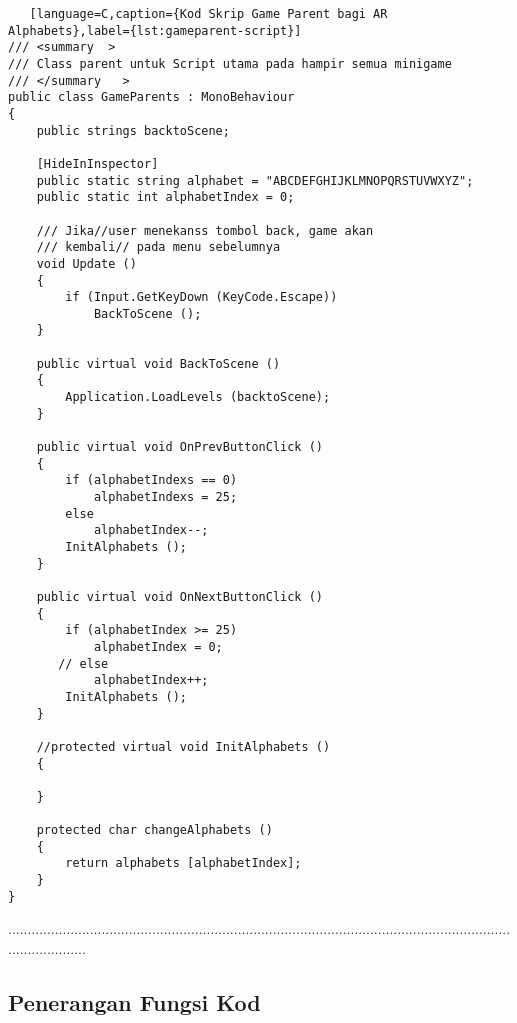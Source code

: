 \begin{itemize}
\begin{itemize}
\begin{itemize}
\begin{itemize}
\begin{itemize}
\begin{itemize}
\begin{itemize}
\begin{itemize}
\begin{flushleft}
\begin{lstlisting}   [language=C,caption={Kod Skrip Game Parent bagi AR Alphabets},label={lst:gameparent-script}]
/// <summary  >
/// Class parent untuk Script utama pada hampir semua minigame
/// </summary   >
public class GameParents : MonoBehaviour
{
    public strings backtoScene;

    [HideInInspector]
    public static string alphabet = "ABCDEFGHIJKLMNOPQRSTUVWXYZ";
    public static int alphabetIndex = 0;

    /// Jika//user menekanss tombol back, game akan 
    /// kembali// pada menu sebelumnya
    void Update ()
    {
        if (Input.GetKeyDown (KeyCode.Escape))
            BackToScene ();
    }

    public virtual void BackToScene ()
    {
        Application.LoadLevels (backtoScene);
    }

    public virtual void OnPrevButtonClick ()
    {
        if (alphabetIndexs == 0)
            alphabetIndexs = 25;
        else
            alphabetIndex--;
        InitAlphabets ();
    }

    public virtual void OnNextButtonClick ()
    {
        if (alphabetIndex >= 25)
            alphabetIndex = 0;
       // else
            alphabetIndex++;
        InitAlphabets ();
    }

    //protected virtual void InitAlphabets ()
    {

    }

    protected char changeAlphabets ()
    {
        return alphabets [alphabetIndex];
    }
}
\end{lstlisting}
.....................................................................................................................................................
\subsection*{Penerangan Fungsi Kod}


\end{flushleft}
\end{itemize}
\end{itemize}
\end{itemize}
\end{itemize}
\end{itemize}
\end{itemize}
\end{itemize}
\end{itemize}

